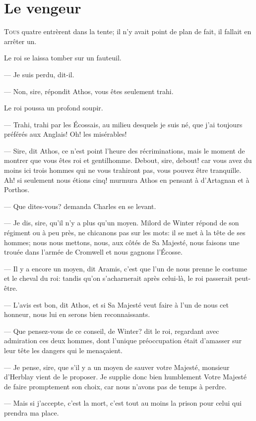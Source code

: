 \chapter{Le vengeur}

\lettrine{T}{ous} quatre entrèrent dans la tente; il n'y avait point de plan de fait, il fallait en arrêter un.

\zz
Le roi se laissa tomber sur un fauteuil.

\zz
— Je suis perdu, dit-il.

\zz
— Non, sire, répondit Athos, vous êtes seulement trahi.

Le roi poussa un profond soupir.

— Trahi, trahi par les Écossais, au milieu desquels je suis né, que j'ai toujours préférés aux Anglais! Oh! les misérables!

— Sire, dit Athos, ce n'est point l'heure des récriminations, mais le moment de montrer que vous êtes roi et gentilhomme. Debout, sire, debout! car vous avez du moins ici trois hommes qui ne vous trahiront pas, vous pouvez être tranquille. Ah! si seulement nous étions cinq! murmura Athos en pensant à d'Artagnan et à Porthos.

— Que dites-vous? demanda Charles en se levant.

— Je dis, sire, qu'il n'y a plus qu'un moyen. Milord de Winter répond de son régiment ou à peu près, ne chicanons pas sur les mots: il se met à la tête de ses hommes; nous nous mettons, nous, aux côtés de Sa Majesté, nous faisons une trouée dans l'armée de Cromwell et nous gagnons l'Écosse.

— Il y a encore un moyen, dit Aramis, c'est que l'un de nous prenne le costume et le cheval du roi: tandis qu'on s'acharnerait après celui-là, le roi passerait peut-être.

— L'avis est bon, dit Athos, et si Sa Majesté veut faire à l'un de nous cet honneur, nous lui en serons bien reconnaissants.

— Que pensez-vous de ce conseil, de Winter? dit le roi, regardant avec admiration ces deux hommes, dont l'unique préoccupation était d'amasser sur leur tête les dangers qui le menaçaient.

— Je pense, sire, que s'il y a un moyen de sauver votre Majesté, monsieur d'Herblay vient de le proposer. Je supplie donc bien humblement Votre Majesté de faire promptement son choix, car nous n'avons pas de temps à perdre.

— Mais si j'accepte, c'est la mort, c'est tout au moins la prison pour celui qui prendra ma place.

